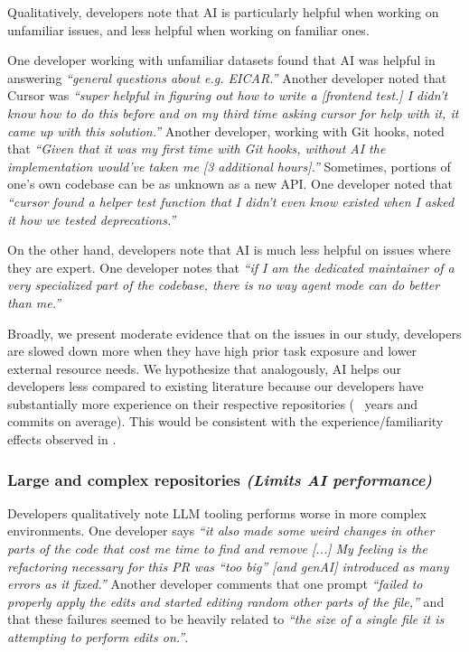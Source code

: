 \documentclass{article}
\newcommand{\devquote}[1]{\textcolor{quotecolor}{\textit{``#1''}}}
\begin{document}
Qualitatively, developers note that AI is particularly helpful when working on unfamiliar issues, and less helpful when working on familiar ones. 

One developer working with unfamiliar datasets found that AI was helpful in answering \devquote{general questions about e.g. EICAR.} Another developer noted that Cursor was \devquote{super helpful in figuring out how to write a [frontend test.] I didn't know how to do this before and on my third time asking cursor for help with it, it came up with this solution.} Another developer, working with Git hooks, noted that \devquote{Given that it was my first time with Git hooks, without AI the implementation would've taken me [3 additional hours].} Sometimes, portions of one’s own codebase can be as unknown as a new API. One developer noted that \devquote{cursor found a helper test function that I didn't even know existed when I asked it how we tested deprecations.} 

On the other hand, developers note that AI is much less helpful on issues where they are expert. One developer notes that \devquote{if I am the dedicated maintainer of a very specialized part of the codebase, there is no way agent mode can do better than me.}

Broadly, we present moderate evidence that on the issues in our study, developers are slowed down more when they have high prior task exposure and lower external resource needs. We hypothesize that analogously, AI helps our developers less compared to existing literature \cite{peng2023impactaideveloperproductivity, paradis2024doesaiimpactdevelopment} because our developers have substantially more experience on their respective repositories (\MeanDevExperienceOnReposYears~ years and \MeanMaintainerCommits~ commits on average). This would be consistent with the experience/familiarity effects observed in \citet{noy2023experimental, cui2025effectsgenerativeai}.


\subsubsection{Large and complex repositories \textnormal{\textit{(Limits AI performance)}}}
\label{sec:factor-large-and-complex-repositories}

Developers qualitatively note LLM tooling performs worse in more complex environments. One developer says \devquote{it also made some weird changes in other parts of the code that cost me time to find and remove [...] My feeling is the refactoring necessary for this PR was ``too big'' [and genAI] introduced as many errors as it fixed.} Another developer comments that one prompt \devquote{failed to properly apply the edits and started editing random other parts of the file,} and that these failures seemed to be heavily related to \devquote{the size of a single file it is attempting to perform edits on.}.
\end{document}
